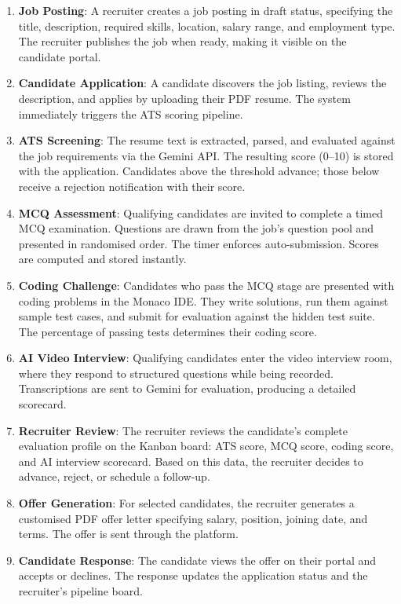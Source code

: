 \begin{enumerate}[leftmargin=1.5em]
  \item \textbf{Job Posting}: A recruiter creates a job posting in draft status, specifying the title, description, required skills, location, salary range, and employment type. The recruiter publishes the job when ready, making it visible on the candidate portal.

  \item \textbf{Candidate Application}: A candidate discovers the job listing, reviews the description, and applies by uploading their PDF resume. The system immediately triggers the ATS scoring pipeline.

  \item \textbf{ATS Screening}: The resume text is extracted, parsed, and evaluated against the job requirements via the Gemini API. The resulting score (0--10) is stored with the application. Candidates above the threshold advance; those below receive a rejection notification with their score.

  \item \textbf{MCQ Assessment}: Qualifying candidates are invited to complete a timed MCQ examination. Questions are drawn from the job's question pool and presented in randomised order. The timer enforces auto-submission. Scores are computed and stored instantly.

  \item \textbf{Coding Challenge}: Candidates who pass the MCQ stage are presented with coding problems in the Monaco IDE. They write solutions, run them against sample test cases, and submit for evaluation against the hidden test suite. The percentage of passing tests determines their coding score.

  \item \textbf{AI Video Interview}: Qualifying candidates enter the video interview room, where they respond to structured questions while being recorded. Transcriptions are sent to Gemini for evaluation, producing a detailed scorecard.

  \item \textbf{Recruiter Review}: The recruiter reviews the candidate's complete evaluation profile on the Kanban board: ATS score, MCQ score, coding score, and AI interview scorecard. Based on this data, the recruiter decides to advance, reject, or schedule a follow-up.

  \item \textbf{Offer Generation}: For selected candidates, the recruiter generates a customised PDF offer letter specifying salary, position, joining date, and terms. The offer is sent through the platform.

  \item \textbf{Candidate Response}: The candidate views the offer on their portal and accepts or declines. The response updates the application status and the recruiter's pipeline board.
\end{enumerate}

